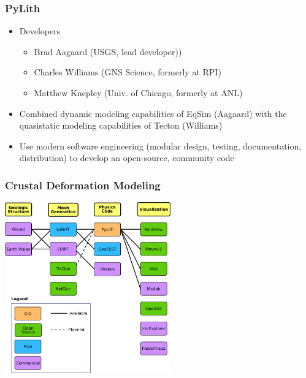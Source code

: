 \documentclass{beamer}
\begin{document}
\begin{frame}
  \frametitle{PyLith}
  \summary{}

  \begin{itemize}
  \item Developers
    \begin{itemize}
    \item Brad Aagaard (USGS, lead developer))
    \item Charles Williams (GNS Science, formerly at RPI)
    \item Matthew Knepley (Univ. of Chicago, formerly at ANL)
    \end{itemize}
  \item Combined dynamic modeling capabilities of EqSim (Aagaard) with
    the quasistatic modeling capabilities of Tecton (Williams)
  \item Use modern software engineering (modular design, testing,
    documentation, distribution) to develop an open-source, community code
  \end{itemize}

\end{frame}


\begin{frame}
  \frametitle{Crustal Deformation Modeling}

  \vfill
  \begin{center}
    \includegraphics[height=2.9in]{figs/workflow}
  \end{center}
  \vfill

\end{frame}


\end{document}
